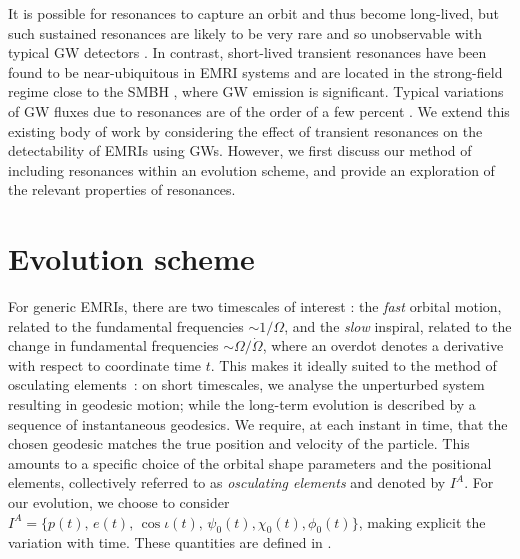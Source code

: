 It is possible for resonances to capture an orbit and thus become long-lived, but such sustained resonances are likely to be very rare and so unobservable with typical GW detectors \citep{van_de_meent_conditions_2014}. In contrast, short-lived transient resonances have been found to be near-ubiquitous in EMRI systems \citep{ruangsri_census_2014} and are located in the strong-field regime close to the SMBH \citep{brink_astrophysics_2015, brink_orbital_2015}, where GW emission is significant. Typical variations of GW fluxes due to resonances are of the order of a few percent \citep{flanagan_resonantly_2014}. We extend this existing body of work by considering the effect of transient resonances on the detectability of EMRIs using GWs. However, we first discuss our method of including resonances within an evolution scheme, and provide an exploration of the relevant properties of resonances.

\section{Evolution scheme}
\label{sec:EMRI-evolution-scheme}
For generic EMRIs, there are two timescales of interest \citep{hinderer_two-timescale_2008}: the \emph{fast} orbital motion, related to the fundamental frequencies $\sim1/\Omega$, and the \emph{slow} inspiral, related to the change in fundamental frequencies $\sim\Omega/\dot{\Omega}$, where an overdot denotes a derivative with respect to coordinate time $t$. This makes it ideally suited to the method of osculating elements~\citep{gair_forced_2011}: on short timescales, we analyse the unperturbed system resulting in geodesic motion; while the long-term evolution is described by a sequence of instantaneous geodesics. We require, at each instant in time, that the chosen geodesic matches the true position and velocity of the particle. This amounts to a specific choice of the orbital shape parameters and the positional elements, collectively referred to as \emph{osculating elements} and denoted by $I^A$. For our evolution, we choose to consider $I^A = \{p(t),\,e(t),\,\cos\iota(t),\,\psi_0(t),\chi_0(t),\phi_0(t)\}$, making explicit the variation with time. These quantities are defined in .

